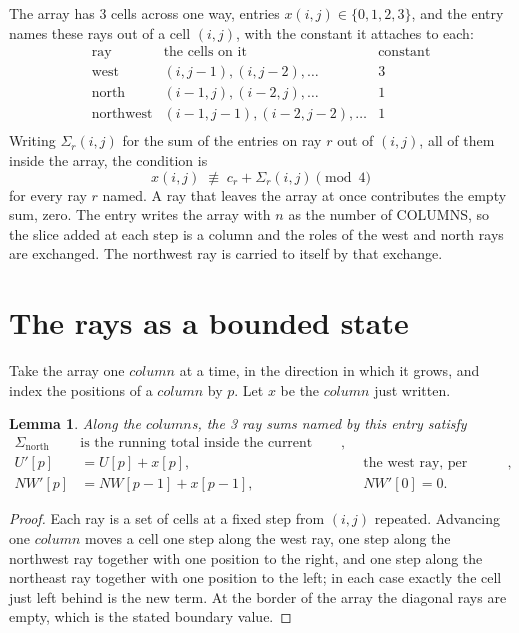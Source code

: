 \documentclass[11pt,a4paper]{article}
\theoremstyle{plain}
\newtheorem{lemma}[theorem]{Lemma}
\theoremstyle{definition}
\begin{document}
The array has $3$ cells across one way, entries $x(i,j)\in\{0,1,2,3\}$, and the entry names these
rays out of a cell $(i,j)$, with the constant it attaches to each:
\[
\begin{array}{lll}
\text{ray} & \text{the cells on it} & \text{constant} \\[2pt]
\text{west} & (i,j-1),(i,j-2),\dots & 3 \\
\text{north} & (i-1,j),(i-2,j),\dots & 1 \\
\text{northwest} & (i-1,j-1),(i-2,j-2),\dots & 1 \\
\end{array}
\]
Writing $\Sigma_r(i,j)$ for the sum of the entries on ray $r$ out of $(i,j)$, all of them
inside the array, the condition is
\[
x(i,j)\;\not\equiv\;c_r+\Sigma_r(i,j) \pmod{4}
\]
for every ray $r$ named. A ray that leaves the array at once contributes the empty sum,
zero. The entry writes the array with $n$ as the number of COLUMNS, so the slice added at each step is a column and the roles of the west and north rays are exchanged. The northwest ray is carried to itself by that exchange.

\section{The rays as a bounded state}

Take the array one $column$ at a time, in the direction in which it grows, and index the
positions of a $column $ by $p$. Let $x$ be the $column$ just written.

\begin{lemma}\label{lem:rays}
Along the $column$s, the 3 ray sums named by this entry satisfy
\[
\begin{aligned}
\Sigma_{\mathrm{north}}\ &\text{is the running total inside the current column},\\
U'[p]&=U[p]+x[p], &&\text{the west ray, per position},\\
NW'[p]&=NW[p-1]+x[p-1], && NW'[0]=0 .
\end{aligned}
\]
\end{lemma}

\begin{proof}
Each ray is a set of cells at a fixed step from $(i,j)$ repeated. Advancing one $column$
moves a cell one step along the west ray, one step along the northwest ray together with one
position to the right, and one step along the northeast ray together with one position to the
left; in each case exactly the cell just left behind is the new term. At the border of the
array the diagonal rays are empty, which is the stated boundary value.
\end{proof}
\end{document}
